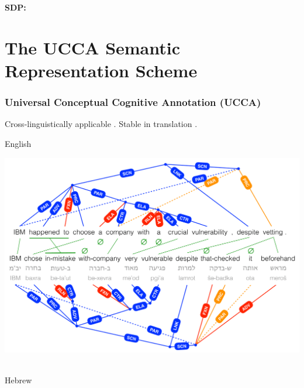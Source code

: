 \documentclass[t,xcolor={svgnames}]{beamer}
\begin{document}
\begin{frame}
	\begin{flushright}
	\begin{minipage}{.02\textwidth}
	{\color{DarkRed}\bf\sffamily\tiny SDP:}
	\end{minipage}
	\begin{minipage}{.6\textwidth}
	    \rmfamily
	\end{minipage}
	\end{flushright}
\end{frame}




\section{The UCCA Semantic Representation Scheme}

\begin{frame}
\frametitle{Universal Conceptual Cognitive Annotation (UCCA)}
Cross-linguistically applicable \cite{abend2013universal}.
Stable in translation \cite{sulem2015conceptual}.

\vfill
English\\
\vspace{-1cm}
\begin{adjustbox}{center}
  \includegraphics[width=\textwidth,height=\textheight,keepaspectratio]{crosslinguistic.png}
\end{adjustbox}
\\
\vspace{-1cm}
Hebrew
\end{frame}
\end{document}
